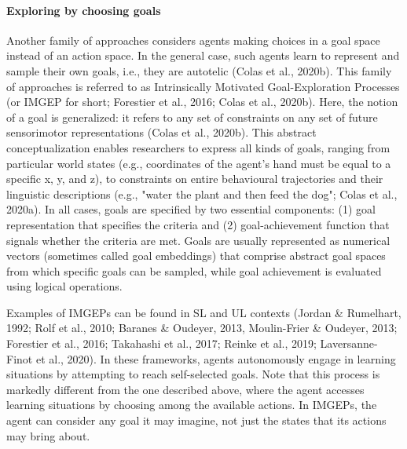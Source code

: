 \paragraph{Exploring by choosing goals}
Another family of approaches considers agents making choices in a goal space instead of an action space. In the general case, such agents learn to represent and sample their own goals, i.e., they are autotelic (Colas et al., 2020b). This family of approaches is referred to as Intrinsically Motivated Goal-Exploration Processes (or IMGEP for short; Forestier et al., 2016; Colas et al., 2020b). Here, the notion of a goal is generalized: it refers to any set of constraints on any set of future sensorimotor representations (Colas et al., 2020b). This abstract conceptualization enables researchers to express all kinds of goals, ranging from particular world states (e.g., coordinates of the agent’s hand must be equal to a specific x, y, and z), to constraints on entire behavioural trajectories and their linguistic descriptions (e.g., "water the plant and then feed the dog"; Colas et al., 2020a). In all cases, goals are specified by two essential components: (1) goal representation that specifies the criteria and (2) goal-achievement function that signals whether the criteria are met. Goals are usually represented as numerical vectors (sometimes called goal embeddings) that comprise abstract goal spaces from which specific goals can be sampled, while goal achievement is evaluated using logical operations.

Examples of IMGEPs can be found in \ac{SL} and \ac{UL} contexts (Jordan \& Rumelhart, 1992; Rolf et al., 2010; Baranes \& Oudeyer, 2013, Moulin-Frier \& Oudeyer, 2013; Forestier et al., 2016; Takahashi et al., 2017; Reinke et al., 2019; Laversanne-Finot et al., 2020). In these frameworks, agents autonomously engage in learning situations by attempting to reach self-selected goals. Note that this process is markedly different from the one described above, where the agent accesses learning situations by choosing among the available actions. In IMGEPs, the agent can consider any goal it may imagine, not just the states that its actions may bring about.

